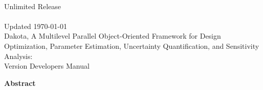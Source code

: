 \documentclass[letterpaper]{book}
\begin{document}
\begin{titlepage}
\setcounter{page}{3}
\begin{center}
{\large \DakotaSANDDev}\\
{\large Unlimited Release}\\
{\large \DakotaSANDDate}\\
{\large Updated \today}\\

\vspace*{1.5cm}
{\LARGE Dakota, A Multilevel Parallel Object-Oriented Framework for 
Design Optimization, Parameter Estimation, Uncertainty Quantification, 
and Sensitivity Analysis:\\Version \DakotaVersion\space Developers Manual}\\
\vspace*{1cm}

\DakotaAuthorFormatted

\pagebreak

{\Large \bf Abstract}
\end{center}

\DakotaAbstractShared
\DakotaAbstractDev

\end{titlepage}

\cleardoublepage
\tableofcontents
\cleardoublepage
%   
\end{document}
